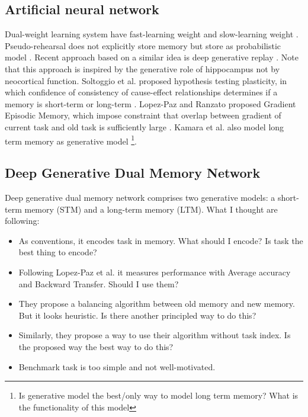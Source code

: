 \documentclass[12pt]{article}
\begin{document}
\subsection{Artificial neural network}
Dual-weight learning system have fast-learning weight and slow-learning weight \cite{Hinton87}. Pseudo-rehearsal 
does not explicitly store memory but store as probabilistic model \cite{Robins95}. Recent approach based on 
a similar idea is deep generative replay \cite{Shin17}. Note that this approach is inspired by the 
generative role of hippocampus not by neocortical function. Soltoggio et al. 
proposed hypothesis testing plasticity, in which confidence of consistency of cause-effect relationships 
determines if a memory is short-term or long-term \cite{Soltoggio15}. Lopez-Paz and Ranzato proposed 
Gradient Episodic Memory, which impose constraint that overlap between gradient of current task and 
old task is sufficiently large \cite{Lopez17}. Kamara et al. also model long term memory 
as generative model \cite{Kemker17,Kemker18} 
\footnote{Is generative model the best/only way to model long term memory? What is the functionality 
of this model}.

\subsection{Deep Generative Dual Memory Network}
Deep generative dual memory network comprises two generative models: 
a short-term memory (STM) and a long-term memory (LTM). What I thought are 
following:
\begin{itemize}
    \item As conventions, it encodes task in memory. What should I encode? Is task the best thing to encode?
    \item Following Lopez-Paz et al. it measures performance with Average accuracy and Backward Transfer. Should I use them?
    \item They propose a balancing algorithm between old memory and new memory. But it looks heuristic. Is there another principled way to do this?
    \item Similarly, they propose a way to use their algorithm without task index. Is the proposed way the best way to do this?
    \item Benchmark task is too simple and not well-motivated. 
\end{itemize}







\end{document}
